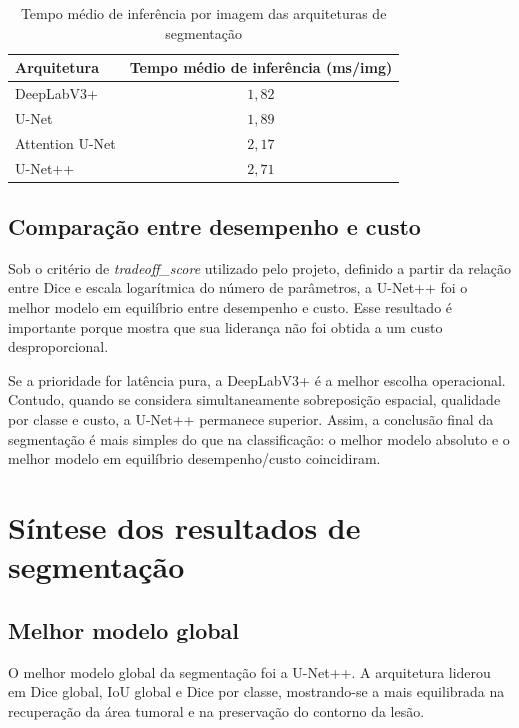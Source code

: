 \documentclass[tcc,capa]{texufpel}
\begin{document}
\begin{table}[htbp]
	\centering
	\caption{Tempo médio de inferência por imagem das arquiteturas de segmentação}
	\label{tab:tempo_inferencia_segmentacao}
	\begin{tabular}{|l|c|}
		\hline
		\textbf{Arquitetura} & \textbf{Tempo médio de inferência (ms/img)} \\ \hline
		DeepLabV3+ & \(1{,}82\) \\ \hline
		U-Net & \(1{,}89\) \\ \hline
		Attention U-Net & \(2{,}17\) \\ \hline
		U-Net++ & \(2{,}71\) \\ \hline
	\end{tabular}
\end{table}

\subsection{Comparação entre desempenho e custo}

Sob o critério de \textit{tradeoff\_score} utilizado pelo projeto, definido a partir da relação entre Dice e escala logarítmica do número de parâmetros, a U-Net++ foi o melhor modelo em equilíbrio entre desempenho e custo. Esse resultado é importante porque mostra que sua liderança não foi obtida a um custo desproporcional.

Se a prioridade for latência pura, a DeepLabV3+ é a melhor escolha operacional. Contudo, quando se considera simultaneamente sobreposição espacial, qualidade por classe e custo, a U-Net++ permanece superior. Assim, a conclusão final da segmentação é mais simples do que na classificação: o melhor modelo absoluto e o melhor modelo em equilíbrio desempenho/custo coincidiram.

\section{Síntese dos resultados de segmentação}

\subsection{Melhor modelo global}

O melhor modelo global da segmentação foi a U-Net++. A arquitetura liderou em Dice global, IoU global e Dice por classe, mostrando-se a mais equilibrada na recuperação da área tumoral e na preservação do contorno da lesão.
\end{document}
